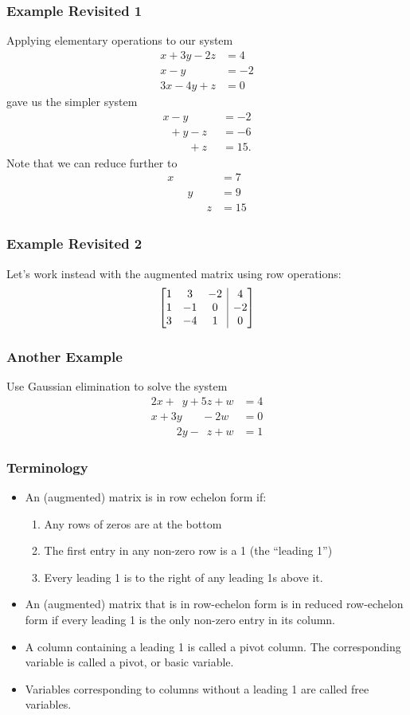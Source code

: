 \documentclass[12pt,t]{beamer}
\makeatletter
\newenvironment{amatrix}[1]{%
  \left[\begin{array}{@{}*{#1}{c}|c@{}}
}{%
  \end{array}\right]
}
\makeatother
\begin{document}
\begin{frame}\frametitle{Example Revisited 1}
 Applying elementary operations to our system
\begin{align*}
 x +3y-2z &= 4\\
 x  -y \phantom{ + 22z} &= -2\\
 3x -4y+z  &= 0
\end{align*}
gave us the simpler system
\begin{align*}
 x - y \phantom{ +22z} & = -2\\
\phantom{x } + y - z & = -6\\
\phantom{x + y} +z & = 15.
\end{align*}
Note that we can reduce further to
\begin{align*} x \phantom{+y + z}& = 7\\
 \phantom{x + } y \phantom{ +z}& = 9\\
\phantom{x + y + } z & = 15 
\end{align*}
\end{frame}
\begin{frame}\frametitle{Example Revisited 2}
 Let's work instead with the augmented matrix using row operations:
\[
  \begin{amatrix}{3}
  1&3&-2&4\\1&-1&0&-2\\3&-4&1&0
 \end{amatrix}
\]
\end{frame}
\begin{frame}\frametitle{Another Example}
 Use Gaussian elimination to solve the system
\begin{align*}
 2x +\phantom{1}y + 5z +w & = 4\\
 x+3y\phantom{+3z}-2w & = 0\\
 \phantom{4x +}2y -\phantom{2}z + w & = 1
\end{align*}

\end{frame}
\begin{frame}\frametitle{Terminology}
\begin{itemize}
 \item  An (augmented) matrix is in \alert{row echelon form} if:
\begin{enumerate}
 \item Any rows of zeros are at the \alert{bottom}
 \item The first entry in any non-zero row is a 1 (the ``leading 1'')
 \item Every leading 1 is to the \alert{right} of any leading 1s above it.
\end{enumerate}
\item An (augmented) matrix that is in row-echelon form is in \alert{reduced} row-echelon form if every leading 1 is the \alert{only} non-zero entry in its column.
\item A column containing a leading 1 is called a \alert{pivot column}. The corresponding variable is called a \alert{pivot}, or \alert{basic variable}.
\item Variables corresponding to columns without a leading 1 are called \alert{free variables}.
\end{itemize}
\end{frame}
\end{document}
